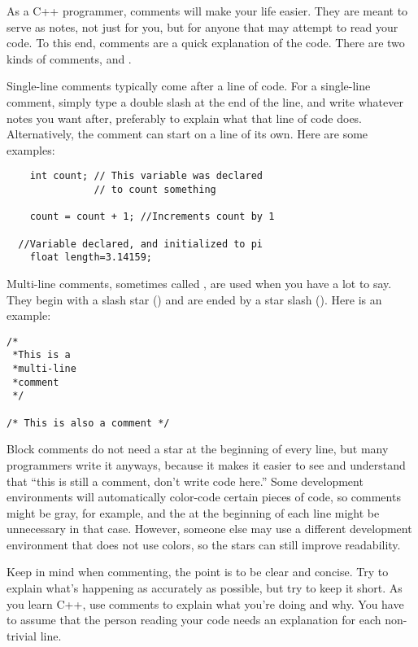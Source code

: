 
As a C++ programmer, comments will make your life easier. 
They are meant to serve as notes, not just for you, but for anyone that may attempt to read your code. 
To this end, comments are a quick explanation of the code. 
There are two kinds of comments,  and .

Single-line comments typically come after a line of code. 
For a single-line comment, simply type a double slash \Code{//} at the end of the line, and write whatever notes you want after, preferably to explain what that line of code does.
Alternatively, the comment can start on a line of its own.
Here are some examples:

\begin{lstlisting}
	int count; // This variable was declared 
	           // to count something

	count = count + 1; //Increments count by 1

  //Variable declared, and initialized to pi
	float length=3.14159; 
\end{lstlisting}

Multi-line comments, sometimes called , are used when you have a lot to say. 
They begin with a slash star (\Code{/*}) and are ended by a star slash (\Code{*/}). 
Here is an example:

\begin{lstlisting}
/* 
 *This is a
 *multi-line 
 *comment
 */
 
/* This is also a comment */ 
\end{lstlisting}

Block comments do not need a star at the beginning of every line, but many programmers write it anyways, because it makes it easier to see and understand that ``this is still a comment, don't write code here.'' 
Some development environments will automatically color-code certain pieces of code, so comments might be gray, for example, and the \Code{*} at the beginning of each line might be unnecessary in that case. 
However, someone else may use a different development environment that does not use colors, so the stars can still improve readability.

Keep in mind when commenting, the point is to be clear and concise. 
Try to explain what's happening as accurately as possible, but try to keep it short. 
As you learn C++, use comments to explain what you're doing and why. 
You have to assume that the person reading your code needs an explanation for each non-trivial line. 